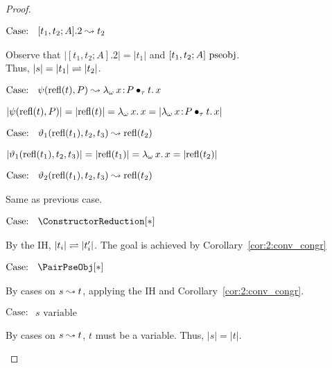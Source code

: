 \begin{proof}
\begin{proofcase}
        $\text{Case: }\begin{array}{c} [t_1, t_2; A].2 \leadsto t_2 \end{array}$
        \begin{proofcase}
            Observe that $|[t_1, t_2; A].2| = |t_1|$ and $[t_1, t_2; A]~\mbox{\normalfont pseobj}$. \\
            Thus, $|s| = |t_1| \rightleftharpoons |t_2|$.
        \end{proofcase}

        $\text{Case: }\begin{array}{c} \psi(\text{refl}(t),P) \leadsto {\lambda_\omega}\, x\! : \! P \bullet_{\tau} t.\, x \end{array}$
        \begin{proofcase}
            $|\psi(\text{refl}(t),P)| = |\text{refl}(t)| = {\lambda_\omega}\, x.\, x = |{\lambda_\omega}\, x\! : \! P \bullet_{\tau} t.\, x|$
        \end{proofcase}

        $\text{Case: }\begin{array}{c} \vartheta_1(\text{refl}(t_1), t_2, t_3) \leadsto \text{refl}(t_2) \end{array}$
        \begin{proofcase}
            $|\vartheta_1(\text{refl}(t_1), t_2, t_3)| = |\text{refl}(t_1)| = {\lambda_\omega}\, x.\, x = |\text{refl}(t_2)|$
        \end{proofcase}

        $\text{Case: }\begin{array}{c} \vartheta_2(\text{refl}(t_1), t_2, t_3) \leadsto \text{refl}(t_2) \end{array}$
        \begin{proofcase}
            Same as previous case.
        \end{proofcase}

        $\text{Case: }\begin{array}{c} \ConstructorReduction[*] \end{array}$
        \begin{proofcase}
            By the IH, $|t_i| \rightleftharpoons |t_i^\prime|$. The goal is achieved by Corollary~\ref{cor:2:conv_congr}
        \end{proofcase}

    \end{proofcase}

    $\text{Case: }\begin{array}{c} \PairPseObj[*] \end{array}$
    \begin{proofcase}
        By cases on $s \leadsto t$, applying the IH and Corollary~\ref{cor:2:conv_congr}.
    \end{proofcase}

    $\text{Case: }\begin{array}{c} s\text{ variable} \end{array}$
    \begin{proofcase}
        By cases on $s \leadsto t$, $t$ must be a variable.
        Thus, $|s| = |t|$.
    \end{proofcase}
\end{proof}

